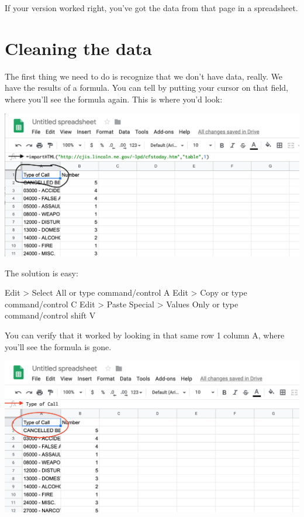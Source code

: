 \documentclass[]{book}
\begin{document}
If your version worked right, you've got the data from that page in a spreadsheet.

\hypertarget{cleaning-the-data}{%
\section{Cleaning the data}\label{cleaning-the-data}}

The first thing we need to do is recognize that we don't have data, really. We have the results of a formula. You can tell by putting your cursor on that field, where you'll see the formula again. This is where you'd look:

\includegraphics[width=25.94in]{images/clean1}

The solution is easy:

Edit \textgreater{} Select All or type command/control A
Edit \textgreater{} Copy or type command/control C
Edit \textgreater{} Paste Special \textgreater{} Values Only or type command/control shift V

You can verify that it worked by looking in that same row 1 column A, where you'll see the formula is gone.

\includegraphics[width=25.61in]{images/clean2}
\end{document}
